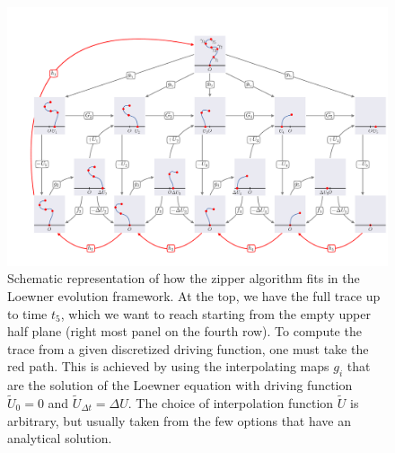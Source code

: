 \begin{figure}
\begin{center}
    \includegraphics[width=\textwidth]{chapters/ch4-sle/figs/zipperdiag}
\end{center}
\caption{Schematic representation of how the zipper algorithm fits in the
    Loewner evolution framework. At the top, we have the full trace up to time
    $t_5$, which we want to reach starting from the empty upper half plane
    (right most panel on the fourth row). To compute the trace from a given
    discretized driving function, one must take the red path. This is achieved
    by using the interpolating maps $g_i$ that are the solution of the Loewner
    equation with driving function $\tilde{U}_0=0$ and $\tilde{U}_{\Delta
    t}=\Delta U$. The choice of interpolation function $\tilde{U}$ is
    arbitrary, but usually taken from the few options that have an analytical
    solution.}
\label{fig:zipperdiag}
\end{figure}

